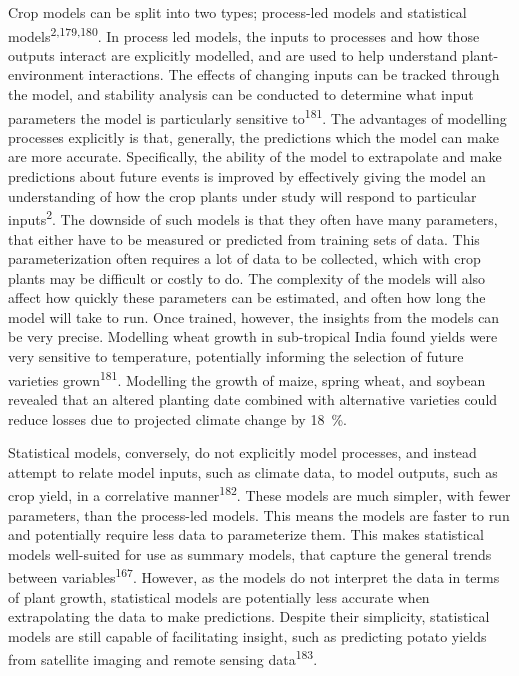 \documentclass[12pt,]{book}
\begin{document}
Crop models can be split into two types; process-led models and
statistical models\textsuperscript{2,179,180}. In process led models,
the inputs to processes and how those outputs interact are explicitly
modelled, and are used to help understand plant-environment
interactions. The effects of changing inputs can be tracked through the
model, and stability analysis can be conducted to determine what input
parameters the model is particularly sensitive to\textsuperscript{181}.
The advantages of modelling processes explicitly is that, generally, the
predictions which the model can make are more accurate. Specifically,
the ability of the model to extrapolate and make predictions about
future events is improved by effectively giving the model an
understanding of how the crop plants under study will respond to
particular inputs\textsuperscript{2}. The downside of such models is
that they often have many parameters, that either have to be measured or
predicted from training sets of data. This parameterization often
requires a lot of data to be collected, which with crop plants may be
difficult or costly to do. The complexity of the models will also affect
how quickly these parameters can be estimated, and often how long the
model will take to run. Once trained, however, the insights from the
models can be very precise. Modelling wheat growth in sub-tropical India
found yields were very sensitive to temperature, potentially informing
the selection of future varieties grown\textsuperscript{181}. Modelling
the growth of maize, spring wheat, and soybean revealed that an altered
planting date combined with alternative varieties could reduce losses
due to projected climate change by 18~\%.

Statistical models, conversely, do not explicitly model processes, and
instead attempt to relate model inputs, such as climate data, to model
outputs, such as crop yield, in a correlative
manner\textsuperscript{182}. These models are much simpler, with fewer
parameters, than the process-led models. This means the models are
faster to run and potentially require less data to parameterize them.
This makes statistical models well-suited for use as summary models,
that capture the general trends between variables\textsuperscript{167}.
However, as the models do not interpret the data in terms of plant
growth, statistical models are potentially less accurate when
extrapolating the data to make predictions. Despite their simplicity,
statistical models are still capable of facilitating insight, such as
predicting potato yields from satellite imaging and remote sensing
data\textsuperscript{183}.
\end{document}
